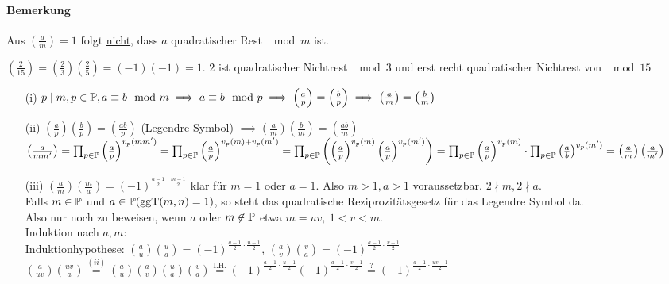 \documentclass[a4paper,DIV15,BCOR12mm]{article}
\begin{document}
\paragraph{Bemerkung}
Aus $\left(\frac{a}{m}\right) = 1$ folgt \underline{nicht}, dass $a$ quadratischer Rest $\mod m$ ist.\\
\begin{beispiel}
    $\left(\frac{2}{15}\right) = \left(\frac{2}{3}\right)\left(\frac{2}{5}\right) = (-1)(-1) =
    1$.
    $2$ ist quadratischer Nichtrest $\mod 3$ und erst recht quadratischer Nichtrest von $\mod 15$
\end{beispiel}

\begin{beweis}
    \begin{itemize}
        \item[(i)] $p \mid m, p \in \mathbb{P}, a \equiv b \mod m \implies a \equiv b \mod p \implies
        \left(\frac{a}{p}\right) = \left(\frac{b}{p}\right) \implies \left(\frac{a}{m}\right) = \left(\frac{b}{m}\right)$
        \item[(ii)] $\left(\frac{a}{p}\right)\left(\frac{b}{p}\right) = \left(\frac{ab}{p}\right)$
        (Legendre Symbol) $\implies \left(\frac{a}{m}\right)\left(\frac{b}{m}\right) = \left(\frac{ab}{m}\right)$\\
            $\left(\frac{a}{mm'}\right) = \prod_{p \in \mathbb{P}}\left(\frac{a}{p}\right)^{v_p(mm')} =
            \prod_{p \in \mathbb{P}}\left(\frac{a}{p}\right)^{v_p(m) + v_p(m')} = \prod_{p \in \mathbb{P}}\left(\left(\frac{a}{p}\right)^{v_p(m)}\left(\frac{a}{p}\right)^{v_p(m')}\right)
            = \prod_{p \in \mathbb{P}}\left(\frac{a}{p}\right)^{v_p(m)} \cdot \prod_{p \in \mathbb{P}}\left(\frac{a}{b}\right)^{v_p(m')}
            = \left(\frac{a}{m}\right)\left(\frac{a}{m'}\right)$
        \item[(iii)] $\left(\frac{a}{m}\right)\left(\frac{m}{a}\right) = (-1)^{\frac{a-1}{2} \cdot \frac{m-1}{2}}$ klar für $m = 1$ oder $a = 1$. Also $m > 1, a > 1$ voraussetzbar. $2 \nmid m, 2 \nmid a$.\\
        Falls $m \in \mathbb{P}$ und $a \in \mathbb{P} (\mathop{\rm ggT}\nolimits (m, n) = 1)$, so steht das quadratische Reziprozitätsgesetz für das Legendre Symbol da.\\
        Also nur noch zu beweisen, wenn $a$ oder $m \not\in \mathbb{P}$ etwa $m = uv,\ 1 < v < m$.\\
        Induktion nach $a,m$:\\
        Induktionhypothese: $\left(\frac{a}{u}\right)\left(\frac{u}{a}\right) = (-1)^{\frac{a - 1}{2} \cdot \frac{u - 1}{2}}$, $\left(\frac{a}{v}\right)\left(\frac{v}{a}\right) = (-1)^{\frac{a - 1}{2} \cdot \frac{v - 1}{2}}$\\
        $\left(\frac{a}{uv}\right)\left(\frac{uv}{a}\right) \stackrel{(ii)}{=} \left(\frac{a}{u}\right)\left(\frac{a}{v}\right)\left(\frac{u}{a}\right)\left(\frac{v}{a}\right) \stackrel{\text{I.H.}}{=} (-1)^{\frac{a-1}{2} \cdot \frac{u - 1}{2}} (-1)^{\frac{a-1}{2} \cdot \frac{v-1}{2}} \stackrel{\text{?}}{=} (-1)^{\frac{a-1}{2} \cdot \frac{uv-1}{2}}$


\end{itemize}
\end{beweis}
\end{document}
